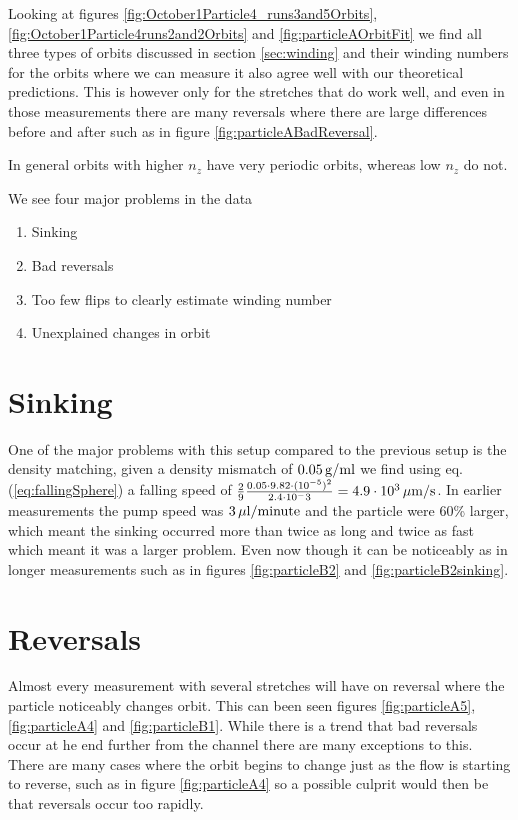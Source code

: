 Looking at figures \ref{fig:October1Particle4_runs3and5Orbits}, \ref{fig:October1Particle4runs2and2Orbits} and \ref{fig:particleAOrbitFit} we find all three types of orbits discussed in section \ref{sec:winding} and their winding numbers for the orbits where we can measure it also agree well with our theoretical predictions. This is however only for the stretches that do work well, and even in those measurements there are many reversals where there are large differences before and after such as in figure \ref{fig:particleABadReversal}. 

In general orbits with higher $n_z$ have very periodic orbits, whereas low $n_z$ do not. 

We see four major problems in the data 

\begin{enumerate}
\item Sinking
\item Bad reversals
\item Too few flips to clearly estimate winding number
\item Unexplained changes in orbit
\end{enumerate}

\section{Sinking}
One of the major problems with this setup compared to the previous setup is the density matching, given a density mismatch of $\unit[0.05]{g/ml}$ we find using eq. (\ref{eq:fallingSphere}) a falling speed of $\frac{2}{9} \frac{0.05 \cdot 9.82 \cdot (10^{-5})^2}{2.4\cdot 10^-3} = \unit[4.9\cdot10^3 ]{\mu m/s}$. In earlier measurements the pump speed was $\unit[3]{\mu l/minute}$ and the particle were 60\% larger, which meant the sinking occurred more than twice as long and twice as fast which meant it was a larger problem. Even now though it can be noticeably as in longer measurements such as in figures \ref{fig:particleB2} and \ref{fig:particleB2sinking}.

\section{Reversals}
Almost every measurement with several stretches will have on reversal where the particle noticeably changes orbit. This can been seen figures \ref{fig:particleA5}, \ref{fig:particleA4} and \ref{fig:particleB1}. While there is a trend that bad reversals occur at he end further from the channel there are many exceptions to this. There are many cases where the orbit begins to change just as the flow is starting to reverse, such as in figure \ref{fig:particleA4} so a possible culprit would then be that reversals occur too rapidly.



